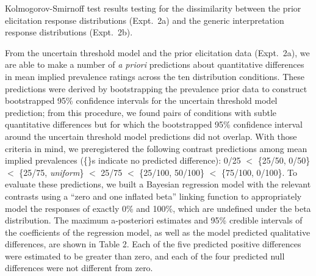 \documentclass[floatsintext,doc]{apa6}
\begin{document}
\begin{center}
  \begin{table}[h]
    \centering

    \caption{Kolmogorov-Smirnoff test results testing for the dissimilarity between the prior elicitation response distributions (Expt.~2a) and the generic interpretation response distributions (Expt.~2b).}
    \label{tab:ks}
  \end{table}
\end{center}





From the uncertain threshold model and the prior elicitation data (Expt.~2a), we are able to make a number of \emph{a priori} predictions about quantitative differences in mean implied prevalence ratings across the ten distribution conditions.
These predictions were derived by bootstrapping the prevalence prior data to construct bootstrapped 95\% confidence intervals for the uncertain threshold model prediction; from this procedure, we found pairs of conditions with subtle quantitative differences but for which the bootstrapped 95\% confidence interval around the uncertain threshold model predictions did not overlap.
With those criteria in mind, we preregistered the following contrast predictions among mean implied prevalences (\{\}s indicate no predicted difference): 0/25 \(<\) \{25/50, 0/50\} \(<\) \{25/75, \emph{uniform}\} \(<\) 25/75 \(<\) \{25/100, 50/100\} \(<\) \{75/100, 0/100\}.
To evaluate these predictions, we built a Bayesian regression model with the relevant contrasts using a \enquote{zero and one inflated beta} linking function to appropriately model the responses of exactly 0\% and 100\%, which are undefined under the beta distribution.
The maximum a-posteriori estimates and 95\% credible intervals of the coefficients of the regression model, as well as the model predicted qualitative differences, are shown in Table 2.
Each of the five predicted positive differences were estimated to be greater than zero, and each of the four predicted null differences were not different from zero.
\end{document}
